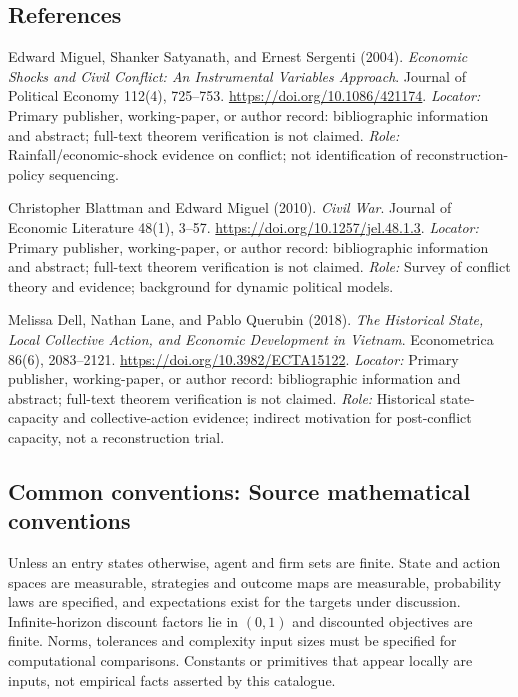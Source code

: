 \documentclass[11pt,a4paper]{article}
\begin{document}
\subsection*{References}
\begin{enumerate}[label=\textnormal{[S\arabic*]},leftmargin=*]
\item Edward Miguel, Shanker Satyanath, and Ernest Sergenti (2004). \emph{Economic Shocks and Civil Conflict: An Instrumental Variables Approach}. Journal of Political Economy 112(4), 725--753. \url{https://doi.org/10.1086/421174}. \textit{Locator:} Primary publisher, working-paper, or author record: bibliographic information and abstract; full-text theorem verification is not claimed. \textit{Role:} Rainfall/economic-shock evidence on conflict; not identification of reconstruction-policy sequencing.
\item Christopher Blattman and Edward Miguel (2010). \emph{Civil War}. Journal of Economic Literature 48(1), 3--57. \url{https://doi.org/10.1257/jel.48.1.3}. \textit{Locator:} Primary publisher, working-paper, or author record: bibliographic information and abstract; full-text theorem verification is not claimed. \textit{Role:} Survey of conflict theory and evidence; background for dynamic political models.
\item Melissa Dell, Nathan Lane, and Pablo Querubin (2018). \emph{The Historical State, Local Collective Action, and Economic Development in Vietnam}. Econometrica 86(6), 2083--2121. \url{https://doi.org/10.3982/ECTA15122}. \textit{Locator:} Primary publisher, working-paper, or author record: bibliographic information and abstract; full-text theorem verification is not claimed. \textit{Role:} Historical state-capacity and collective-action evidence; indirect motivation for post-conflict capacity, not a reconstruction trial.
\end{enumerate}

\subsection*{Common conventions: Source mathematical conventions}

Unless an entry states otherwise, agent and firm sets are finite. State and action spaces are measurable, strategies and outcome maps are measurable, probability laws are specified, and expectations exist for the targets under discussion. Infinite-horizon discount factors lie in $(0,1)$ and discounted objectives are finite. Norms, tolerances and complexity input sizes must be specified for computational comparisons. Constants or primitives that appear locally are inputs, not empirical facts asserted by this catalogue.
\end{document}
